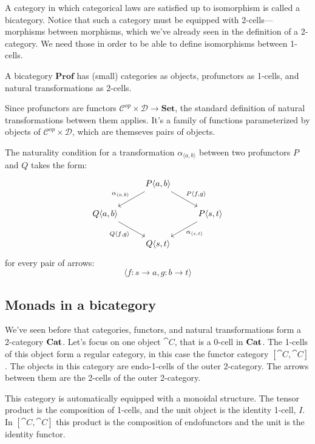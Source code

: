 \documentclass[DaoFP]{subfiles}
\begin{document}
A category in which categorical laws are satisfied up to isomorphism is called a bicategory. Notice that such a category must be equipped with 2-cells---morphisms between morphisms, which we've already seen in the definition of a 2-category. We need those in order to be able to define isomorphisms between 1-cells. 

A bicategory $\mathbf{Prof}$ has (small) categories as objects, profunctors as 1-cells, and natural transformations as 2-cells. 

Since profunctors are functors $\mathcal{C}^{op} \times  \mathcal{D} \to \mathbf{Set}$, the standard definition of natural transformations between them applies. It's a family of functions parameterized by objects of $\mathcal{C}^{op} \times  \mathcal{D}$, which are themseves pairs of objects. 

The naturality condition for a transformation $\alpha_{\langle a, b \rangle}$ between two profunctors $P$ and $Q$ takes the form:
\[
 \begin{tikzcd}
 &P \langle a, b \rangle
 \arrow[ld, "{\alpha_{\langle a, b \rangle}}"']
 \arrow[rd, "{P \langle f, g \rangle}"]
 \\
 Q \langle a, b \rangle
 \arrow[dr, "{Q \langle f, g \rangle}"']
 &&P \langle s, t \rangle
 \arrow[dl, "{\alpha_{\langle s, t \rangle}}"]
 \\
 & Q \langle s, t \rangle
 \end{tikzcd}
\]
for every pair of arrows:
\[ \langle f \colon s \to a, g \colon b \to t \rangle \]

\subsection{Monads in a bicategory}

We've seen before that categories, functors, and natural transformations form a 2-category $\mathbf{Cat}$. Let's focus on one object $\cat C$, that is a 0-cell in $\mathbf{Cat}$. The 1-cells of this object form a regular category, in this case the functor category $[\cat C, \cat C]$. The objects in this category are endo-1-cells of the outer 2-category. The arrows between them are the 2-cells of the outer 2-category.

This category is automatically equipped with a monoidal structure. The tensor product is the composition of 1-cells, and the unit object is the identity 1-cell, $I$. In $[\cat C, \cat C]$ this product is the composition of endofunctors and the unit is the identity functor. 
\end{document}
